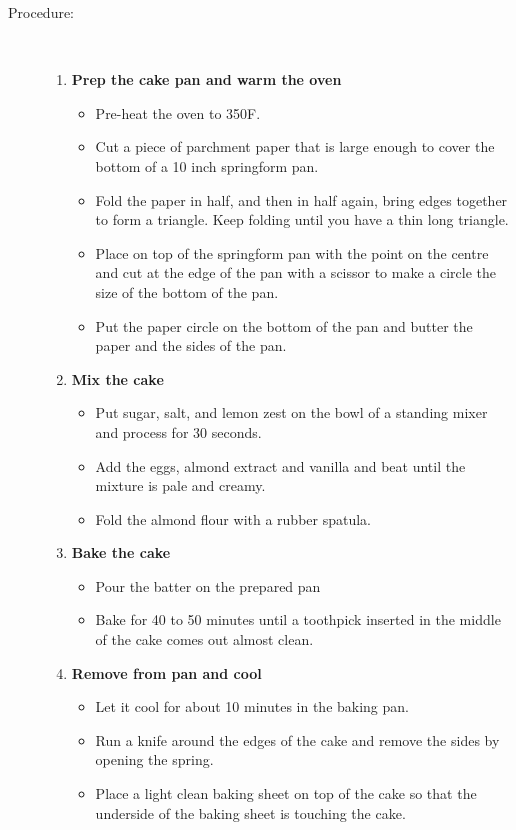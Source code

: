 \documentclass[11pt,letterpaper]{article}
\begin{document}
\begin{description}
\item[Procedure:]\ \\
	\begin{enumerate}
	\item {\bf Prep the cake pan and warm the oven}
	\begin{itemize}
	\item Pre-heat the oven to 350F.
	\item Cut a piece of parchment paper that is large enough to cover the bottom of a 10 inch springform pan.
	\item Fold the paper in half, and then in half again, bring edges together to form a triangle. Keep folding until you have a thin long triangle.
	\item Place on top of the springform pan with the point on the centre and cut at the edge of the pan with a scissor to make a circle the size of the bottom of the pan.
	\item Put the paper circle on the bottom of the pan and butter the paper and the sides of the pan.
	\end{itemize}
	\item {\bf Mix the cake }
	\begin{itemize}
	\item Put sugar, salt, and lemon zest on the bowl of a standing mixer and process for 30 seconds.
        \item Add the eggs, almond extract and vanilla and beat until the mixture is pale and creamy.
	\item Fold the almond flour with a rubber spatula.
	\end{itemize}
	\item {\bf Bake the cake}
	\begin{itemize}
	\item Pour the batter on the prepared pan
	\item Bake for 40 to 50 minutes until a toothpick inserted in the middle of the cake comes out almost clean.
	\end{itemize}
	\item {\bf Remove from pan and cool}
	\begin{itemize}
	\item Let it cool for about 10 minutes in the baking pan.
	\item Run a knife around the edges of the cake and remove the sides by opening the spring.
	\item Place a light clean baking sheet on top of the cake so that the underside of the baking sheet is touching the cake.

\end{itemize}
\end{enumerate}
\end{description}
\end{document}
